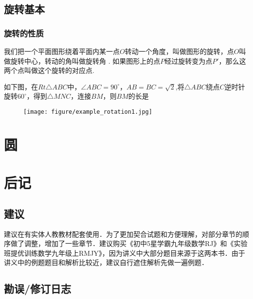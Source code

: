 \documentclass[lang=cn, 10pt, titlestyle=display, oneside, toc=twocol]{elegantbook}
\begin{document}
\section{旋转基本}

\subsection{旋转的性质}

我们把一个平面图形绕着平面内某一点\(O \)转动一个角度，叫做图形的旋转，点\(O \)叫做旋转中心，转动的角叫做旋转角 . 如果图形上的点\(P \)经过旋转变为点\(P' \)，那么这两个点叫做这个旋转的对应点.

\begin{example}
    如下图，在\(Rt\triangle ABC \)中，\(\angle ABC = 90^\circ \)，\(AB=BC=\sqrt{2}\),将\(\triangle ABC\)绕点\(C\)逆时针旋转\(60^\circ\)，得到\(\triangle MNC\)，连接\(BM\)，则\(BM\)的长是 \underline{\hspace{3em}}
    
\begin{figure}[h]
    \raggedright
    \texttt{[image: figure/example\_rotation1.jpg]}
    
    \label{fig:enter-label}
\end{figure}
    
\end{example}



\chapter{圆}





\chapter*{后记}

\section*{建议}

建议在有实体人教教材配套使用．为了更加契合试题和方便理解，对部分章节的顺序做了调整，增加了一些章节．建议购买《初中5星学霸九年级数学RJ》和《实验班提优训练数学九年级上RMJY》，因为讲义中大部分题目来源于这两本书．由于讲义中的例题题目和解析比较近，建议自行遮住解析先做一遍例题．

\section*{勘误/修订日志}
\end{document}
